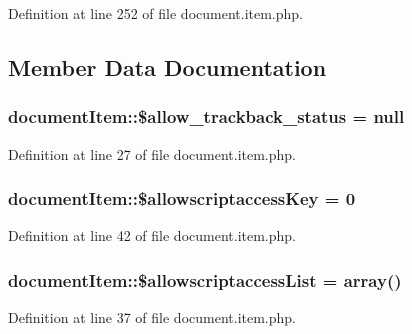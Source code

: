 Definition at line 252 of file document.\+item.\+php.



\subsection{Member Data Documentation}
\hypertarget{classdocumentItem_aaf08d80bedc01fc0fc0370677a4ba9cc}{
\subsubsection[{\$allow\+\_\+trackback\+\_\+status}]{\setlength{\rightskip}{0pt plus 5cm}document\+Item\+::\$allow\+\_\+trackback\+\_\+status = null}}\label{classdocumentItem_aaf08d80bedc01fc0fc0370677a4ba9cc}


Definition at line 27 of file document.\+item.\+php.

\hypertarget{classdocumentItem_ab4273ebe05df985235bf651d918bd4f8}{
\subsubsection[{\$allowscriptaccess\+Key}]{\setlength{\rightskip}{0pt plus 5cm}document\+Item\+::\$allowscriptaccess\+Key = 0}}\label{classdocumentItem_ab4273ebe05df985235bf651d918bd4f8}


Definition at line 42 of file document.\+item.\+php.

\hypertarget{classdocumentItem_a3b10cc840f3a20580d3ab2269ef24df3}{
\subsubsection[{\$allowscriptaccess\+List}]{\setlength{\rightskip}{0pt plus 5cm}document\+Item\+::\$allowscriptaccess\+List = array()}}\label{classdocumentItem_a3b10cc840f3a20580d3ab2269ef24df3}


Definition at line 37 of file document.\+item.\+php.

